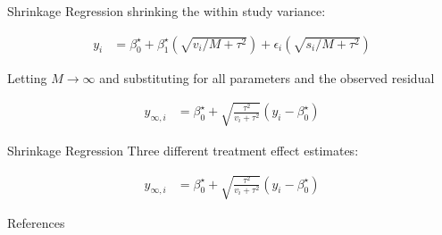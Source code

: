 \documentclass[english]{beamer}\usepackage[]{graphicx}\usepackage[]{color}
\begin{document}
\begin{frame}[fragile]{Shrinkage Regression}
shrinking the within study variance:

\vspace{-4mm}
\begin{align}
y_{i} &= \beta_{0}^\star + \beta_{1}^\star(\sqrt{v_{i}/M + \tau^2}) + \epsilon_{i}(\sqrt{s_{i}/M + \tau^2}) \nonumber
\end{align}

Letting $M \rightarrow \infty$ and substituting for all parameters and the observed residual

\vspace{-8mm}
\begin{align}
y_{\infty,i} &= \beta_{0}^\star + \sqrt{\frac{\tau^2}{v_{i} + \tau^2}}(y_{i} - \beta_{0}^\star)
\end{align}

\end{frame}

\begin{frame}[fragile]{Shrinkage Regression}
Three different treatment effect estimates:

\begin{align}
y_{\infty,i} &= \beta_{0}^\star + \sqrt{\frac{\tau^2}{v_{i} + \tau^2}}(y_{i} - \beta_{0}^\star)
\end{align}


\end{frame}




\begin{frame}{References}
  \small
  

\end{frame}




\end{document}
